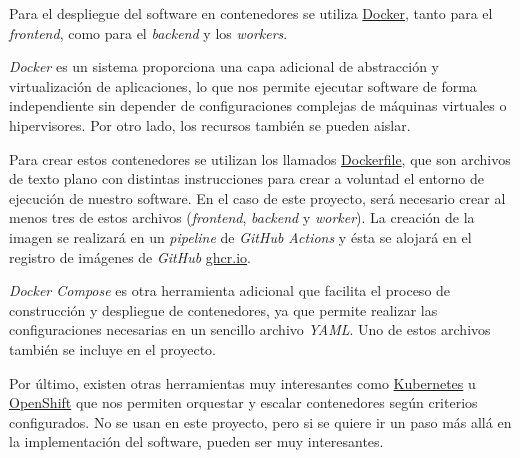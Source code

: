 Para el despliegue del software en contenedores se utiliza \href{https://www.docker.com/}{Docker}, tanto para el \textit{frontend}, como para el \textit{backend} y los \textit{workers}.

\textit{Docker} es un sistema proporciona una capa adicional de abstracción y virtualización de aplicaciones, lo que nos permite ejecutar software de forma independiente sin depender de configuraciones complejas de máquinas virtuales o hipervisores. Por otro lado, los recursos también se pueden aislar.

Para crear estos contenedores se utilizan los llamados \href{https://docs.docker.com/engine/reference/builder/}{Dockerfile}, que son archivos de texto plano con distintas instrucciones para crear a voluntad el entorno de ejecución de nuestro software. En el caso de este proyecto, será necesario crear al menos tres de estos archivos (\textit{frontend}, \textit{backend} y \textit{worker}). La creación de la imagen se realizará en un \textit{pipeline} de \textit{GitHub Actions} y ésta se alojará en el registro de imágenes de \textit{GitHub} \href{https://github.com/features/packages}{ghcr.io}.

\textit{Docker Compose} es otra herramienta adicional que facilita el proceso de construcción y despliegue de contenedores, ya que permite realizar las configuraciones necesarias en un sencillo archivo \textit{YAML}. Uno de estos archivos también se incluye en el proyecto.

Por último, existen otras herramientas muy interesantes como \href{https://kubernetes.io/es/}{Kubernetes} u \href{https://www.redhat.com/es/technologies/cloud-computing/openshift}{OpenShift} que nos permiten orquestar y escalar contenedores según criterios configurados. No se usan en este proyecto, pero si se quiere ir un paso más allá en la implementación del software, pueden ser muy interesantes.
